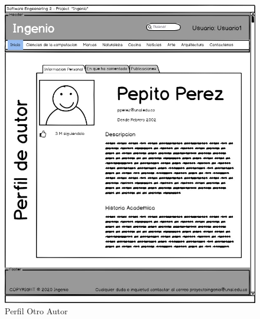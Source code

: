 \documentclass[a4paper,12 pt]{article}
\begin{document}
\begin{figure}[H]
    \centering
    \includegraphics[scale = 0.7]{images/PerfilOtroAutor.jpg}
    \caption{Perfil Otro Autor}
    \label{F108}
\end{figure}{}
\end{document}
